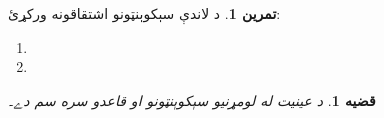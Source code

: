 \documentclass[12pt,a4paper,oneside]{report}
\newcommand{\olfileid}[3]{\gdef\pspart{#1}\gdef\pschapter{#2}\gdef\pssection{#3}}
\gdef\pspart{#2}\gdef\pschapter{#3}\gdef\pssection{}%
\newtheorem{prop}[thm]{قضيه}
\theoremstyle{definition}
\newtheorem{prob}[thm]{تمرين}
\begin{document}
\label{olpseg:OLP-0082-B012:start}
\begin{prob}
د لاندې سېکوېنټونو اشتقاقونه ورکړئ:
\begin{enumerate}
\item \LR{$\Sequent \lforall[x][\lforall[y][((x = y \land !A(x)) \lif !A(y))]]$}
\item {}
\end{enumerate}
\end{prob}
\label{olpseg:OLP-0082-B012:end}

\label{olpseg:OLP-0083-B004:start}
\olfileid{fol}{seq}{sid}
\label{olpseg:OLP-0083-B004:end}

\label{olpseg:OLP-0083-B005:start}
\label{olpseg:OLP-0083-B005:end}

\label{olpseg:OLP-0083-B006:start}
\begin{prop}
 د عينيت له لومړنيو سېکوېنټونو او قاعدو سره سم دے۔
\end{prop}
\label{olpseg:OLP-0083-B006:end}
\end{document}

